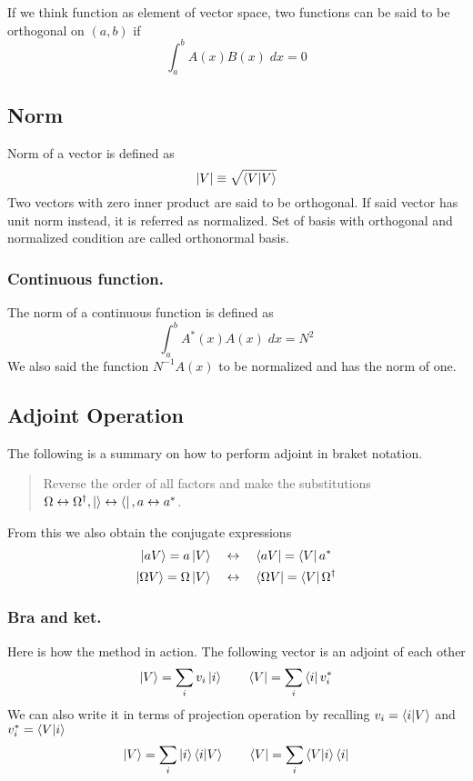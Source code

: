 \documentclass[../main.tex]{subfiles}
\begin{document}
If we think function as element of vector space, two functions can be said to be orthogonal on $(a,b)$ if
\begin{equation*}
	\int_{a}^{b}A(x)B(x)\;dx=0
\end{equation*}

\subsection*{Norm}
Norm of a vector is defined as
\begin{equation*}
	|V|\equiv\sqrt{\braket{V|V}}
\end{equation*}
Two vectors with zero inner product are said to be orthogonal.
If said vector has unit norm instead, it is referred as normalized.
Set of basis with orthogonal and normalized condition are called orthonormal basis.

\subsubsection*{Continuous function.}
The norm of a continuous function is defined as
\begin{equation*}
	\int_{a}^{b}A^*(x)A(x)\;dx=N^2
\end{equation*}
We also said the function $N^{-1}A(x)$ to be normalized and has the norm of one.

\subsection*{Adjoint Operation}
The following is a summary on how to perform adjoint in braket notation.
\begin{quotation}
	Reverse the order of all factors and make the substitutions $\Omega\leftrightarrow\Omega^\dagger,\ket{}\leftrightarrow \bra{}, a\leftrightarrow a^*$.
\end{quotation}
From this we also obtain the conjugate expressions
\begin{align*}
	\ket{aV}=a \ket{V}\quad            & \leftrightarrow \quad\bra{aV}=\bra{V}a^*                 \\
	\ket{\Omega V}=\Omega \ket{V}\quad & \leftrightarrow\quad\bra{\Omega V}=\bra{V}\Omega^\dagger
\end{align*}

\subsubsection*{Bra and ket.}
Here is how the method in action.
The following vector is an adjoint of each other
\begin{equation*}
	\ket{V}=\sum_iv_i \ket{i}\qquad \bra{V}=\sum_i \bra{i}v_i^*
\end{equation*}
We can also write it in terms of projection operation by recalling $v_i=\braket{i|V}$ and $v_i^*=\braket{V|i}$
\begin{equation*}
	\ket{V}=\sum_i \ket{i} \braket{i|V}\qquad \bra{V}=\sum_i \braket{V|i}\bra{i}
\end{equation*}
\end{document}
